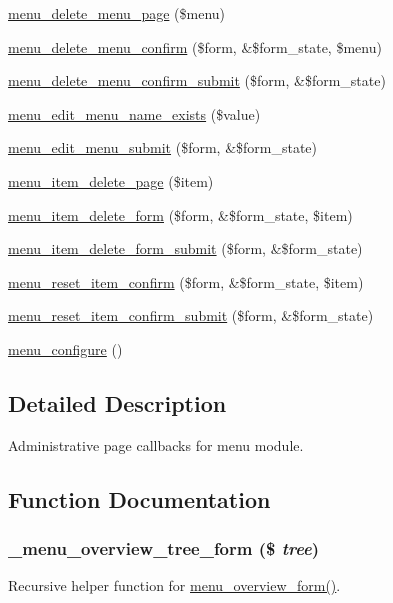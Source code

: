 \begin{DoxyCompactItemize}
\item 
\hyperlink{menu_8admin_8inc_af56ae21f49fb3d481e215ad875f9b4f2}{menu\_\-delete\_\-menu\_\-page} (\$menu)
\item 
\hyperlink{menu_8admin_8inc_a3eb24a09e4b37396508e69a9cf3fe789}{menu\_\-delete\_\-menu\_\-confirm} (\$form, \&\$form\_\-state, \$menu)
\item 
\hyperlink{menu_8admin_8inc_a072747a64b798d6967fbf81e046a5475}{menu\_\-delete\_\-menu\_\-confirm\_\-submit} (\$form, \&\$form\_\-state)
\item 
\hyperlink{menu_8admin_8inc_aa3f0e1738307797efc1d7b8502064020}{menu\_\-edit\_\-menu\_\-name\_\-exists} (\$value)
\item 
\hyperlink{menu_8admin_8inc_a71326ad2f1a2c791cc3e6081a9d28d26}{menu\_\-edit\_\-menu\_\-submit} (\$form, \&\$form\_\-state)
\item 
\hyperlink{menu_8admin_8inc_a2aaea348b520cd9c44792983f1749cfa}{menu\_\-item\_\-delete\_\-page} (\$item)
\item 
\hyperlink{menu_8admin_8inc_afd1809bec6c30cd2223bdc981aa55f49}{menu\_\-item\_\-delete\_\-form} (\$form, \&\$form\_\-state, \$item)
\item 
\hyperlink{menu_8admin_8inc_a68d6f7a22501af5a1e4864996008c0b7}{menu\_\-item\_\-delete\_\-form\_\-submit} (\$form, \&\$form\_\-state)
\item 
\hyperlink{menu_8admin_8inc_a81f4a32073dbf3043c53b003ba0ba499}{menu\_\-reset\_\-item\_\-confirm} (\$form, \&\$form\_\-state, \$item)
\item 
\hyperlink{menu_8admin_8inc_a84c625e0f863a78cf6c68f16e136422f}{menu\_\-reset\_\-item\_\-confirm\_\-submit} (\$form, \&\$form\_\-state)
\item 
\hyperlink{menu_8admin_8inc_a06edf99d84102336d33cb6fd3201d1ca}{menu\_\-configure} ()
\end{DoxyCompactItemize}


\subsection{Detailed Description}
Administrative page callbacks for menu module. 

\subsection{Function Documentation}
\hypertarget{menu_8admin_8inc_a15e0c24820f3445628b676e212e5fbcc}{
\subsubsection[{\_\-menu\_\-overview\_\-tree\_\-form}]{\setlength{\rightskip}{0pt plus 5cm}\_\-menu\_\-overview\_\-tree\_\-form (\$ {\em tree})}}
\label{menu_8admin_8inc_a15e0c24820f3445628b676e212e5fbcc}
Recursive helper function for \hyperlink{menu_8admin_8inc_a460cda2f4e09b8281c8c9e01bf65360b}{menu\_\-overview\_\-form()}.


